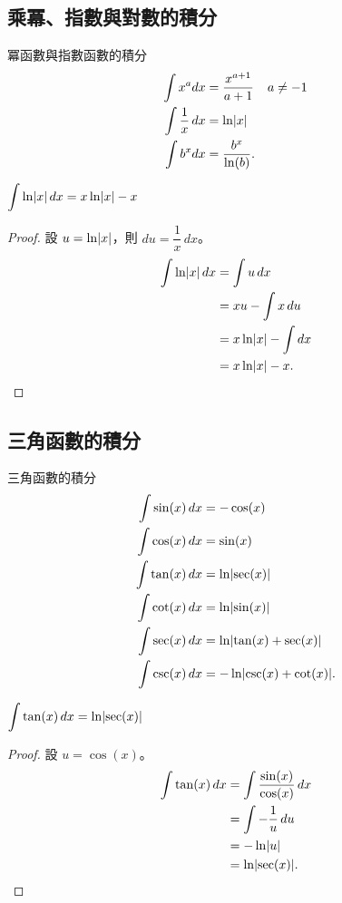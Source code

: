 \documentclass{beamer}
\newcommand{\Left} {\mathopen{}\mathclose\bgroup\left}
\newcommand{\Right}{\aftergroup\egroup\right}
\theoremstyle{remark}
\begin{document}
\begin{CJK}{UTF8}{bsmi}
\subsection[乘冪、指對數的積分]{乘冪、指數與對數的積分}
\begin{frame}{冪函數與指數函數的積分}
  \begin{align*}
    \int x^a dx &= \frac{x^{a+1}}{a+1} & a \ne -1\\
    \int \frac{1}{x}\,dx &= \ln \Left| x \Right|\\
    \int b^x dx &= \frac{b^x}{\ln(b)}.\\
  \end{align*}
\end{frame}

\begin{frame}{$\displaystyle \int \ln \Left| x \Right|\,dx = x \ln \Left| x \Right| - x$}
  \begin{proof}
    設 $u = \ln \Left| x \Right|$，則 $du = \dfrac{1}{x}\,dx$。
    \begin{align*}
      \int \ln \Left| x \Right|\,dx &= \int u\,dx\\
	&= xu - \int x\,du\\
	&= x \ln \Left| x \Right| - \int dx\\
	&= x \ln \Left| x \Right| - x. \qedhere
    \end{align*}
  \end{proof}
\end{frame}

\subsection{三角函數的積分}
\begin{frame}{三角函數的積分}
  \begin{align*}
    \int \sin(x)\,dx &= -\cos(x)\\
    \int \cos(x)\,dx &= \sin(x)\\
    \int \tan(x)\,dx &= \ln \Left| \sec(x) \Right|\\
    \int \cot(x)\,dx &= \ln \Left| \sin(x) \Right|\\
    \int \sec(x)\,dx &= \ln \Left| \tan(x) + \sec(x) \Right|\\
    \int \csc(x)\,dx &= -\ln \Left| \csc(x) + \cot(x) \Right|.
  \end{align*}
\end{frame}

\begin{frame}{$\displaystyle \int \tan(x)\,dx = \ln \Left| \sec(x) \Right|$}
  \begin{proof}
    設 $u = \cos(x)$。
    \begin{align*}
      \int \tan(x)\,dx &= \int \frac{\sin(x)}{\cos(x)}\,dx\\
        &= \int -\frac{1}{u}\,du\\
	&= -\ln \Left| u \Right|\\
	&= \ln \Left| \sec(x) \Right|. \qedhere
    \end{align*}
  \end{proof}
\end{frame}


\end{CJK}
\end{document}
